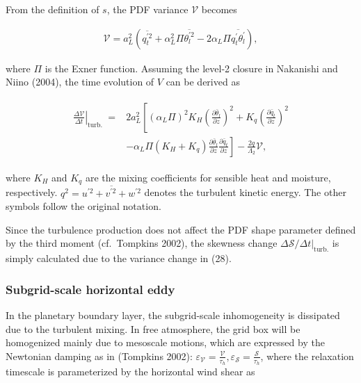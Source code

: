 From the definition of \(s\), the PDF variance \(\mathcal{V}\) becomes

\begin{eqnarray}
\mathcal{V}=a_{L}^{2}\left(\overline{q_{t}^{\prime 2}}+\alpha_{L}^{2} \Pi \overline{\theta_{l}^{\prime 2}}-2 \alpha_{L} \Pi \overline{q_{t}^{\prime} \theta_{l}^{\prime}}\right),
\end{eqnarray}

where \(\Pi\) is the Exner function. Assuming the level-2 closure in
Nakanishi and Niino (2004), the time evolution of \(V\) can be derived
as

\begin{eqnarray}
\begin{aligned}
\left.\frac{\Delta \mathcal{V}}{\Delta t}\right|_{\text {turb. }}=& 2 a_{L}^{2}\left[\left(\alpha_{L} \Pi\right)^{2} K_{H}\left(\frac{\partial \bar{\theta}_{l}}{\partial z}\right)^{2}+K_{q}\left(\frac{\partial \bar{q}_{t}}{\partial z}\right)^{2}\right.\\
&\left.-\alpha_{L} \Pi\left(K_{H}+K_{q}\right) \frac{\partial \bar{\theta}_{l}}{\partial z} \frac{\partial \bar{q}_{t}}{\partial z}\right]-\frac{2 q}{\Lambda_{2}} \mathcal{V},
\end{aligned}
\label{W09-28}
\end{eqnarray}

where \(K_H\) and \(K_q\) are the mixing coefficients for sensible heat
and moisture, respectively.
\(q^{2}=\overline{u^{\prime 2}+v^{\prime 2}+w^{\prime 2}}\) denotes the
turbulent kinetic energy. The other symbols follow the original
notation.

Since the turbulence production does not affect the PDF shape parameter
defined by the third moment (cf.~Tompkins 2002), the skewness change
\(\Delta \mathcal{S} /\left.\Delta t\right|_{\text {turb.}}\) is simply
calculated due to the variance change in (28).

\hypertarget{subgrid-scale-horizontal-eddy}{%
\subsubsection{Subgrid-scale horizontal
eddy}\label{subgrid-scale-horizontal-eddy}}

In the planetary boundary layer, the subgrid-scale inhomogeneity is
dissipated due to the turbulent mixing. In free atmosphere, the grid box
will be homogenized mainly due to mesoscale motions, which are expressed
by the Newtonian damping as in (Tompkins 2002):
\(\varepsilon_{\mathcal{V}}=\frac{\mathcal{V}}{\tau_{h}}, \varepsilon_{\mathcal{S}}=\frac{\mathcal{S}}{\tau_{h}}\),
where the relaxation timescale is parameterized by the horizontal wind
shear as

